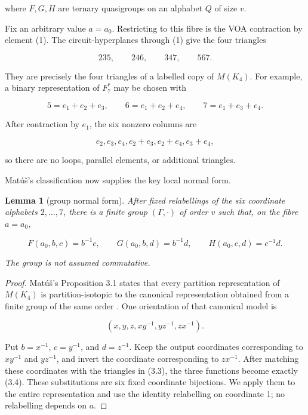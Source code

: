 \documentclass[11pt]{article}
\newtheorem{lemma}[theorem]{Lemma}
\numberwithin{equation}{section}
\begin{document}
where $F,G,H$ are ternary quasigroups on an alphabet $Q$ of size $v$.

Fix an arbitrary value $a=a_0$. Restricting to this fibre is the VOA
contraction by element (1). The circuit-hyperplanes through (1) give the
four triangles

\nopagebreak[4]
\[
235,\qquad 246,\qquad 347,\qquad 567.  \tag{3.3}
\]

They are precisely the four triangles of a labelled copy of $M(K_4)$.
For example, a binary representation of $F_7^*$ may be chosen with

\nopagebreak[4]
\[
5=e_1+e_2+e_3,\qquad
6=e_1+e_2+e_4,\qquad
7=e_1+e_3+e_4.
\]

After contraction by $e_1$, the six nonzero columns are

\nopagebreak[4]
\[
e_2,e_3,e_4,e_2+e_3,e_2+e_4,e_3+e_4,
\]

so there are no loops, parallel elements, or additional triangles.

Mat\'u\v{s}'s classification now supplies the key local normal form.

\Needspace{0.26\textheight}
\begin{lemma}[group normal form]
After fixed relabellings of the six
coordinate alphabets $2,\ldots,7$, there is a finite group
$(\Gamma,\cdot)$ of order $v$ such that, on the fibre $a=a_0$,

\nopagebreak[4]
\[
F(a_0,b,c)=b^{-1}c,\qquad
G(a_0,b,d)=b^{-1}d,\qquad
H(a_0,c,d)=c^{-1}d.                  \tag{3.4}
\]

The group is not assumed commutative.

\end{lemma}

\begin{proof}
Mat\'u\v{s}'s Proposition 3.1 states that every partition representation
of $M(K_4)$ is partition-isotopic to the canonical representation obtained
from a finite group of the same order \cite{matus1999}. One orientation of that canonical
model is

\nopagebreak[4]
\[
(x,y,z,xy^{-1},yz^{-1},zx^{-1}).     \tag{3.5}
\]

Put $b=x^{-1}$, $c=y^{-1}$, and $d=z^{-1}$. Keep the output
coordinates corresponding to $xy^{-1}$ and $yz^{-1}$, and invert the
coordinate corresponding to $zx^{-1}$. After matching these coordinates
with the triangles in (3.3), the three functions become exactly (3.4).
These substitutions are six fixed coordinate bijections. We apply them to
the entire representation and use the identity relabelling on coordinate
1; no relabelling depends on $a$.
\end{proof}
\end{document}
